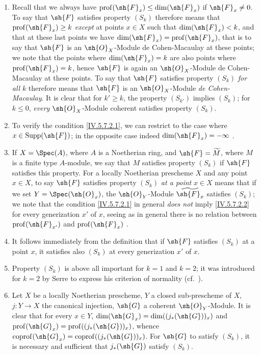 \begin{remarks}[5.7.3]
\label{IV.5.7.3}
\begin{enumerate}[label=(\roman*)]
  \item Recall that we always have $\operatorname{prof}(\sh{F}_x)\leq\dim(\sh{F}_x)$  if $\sh{F}_x\neq 0$.
To say that $\sh{F}$ satisfies property $(S_k)$ therefore means that $\operatorname{prof}(\sh{F}_x)\geq k$ \emph{except} at points $x\in X$ such that $\dim(\sh{F}_x)<k$, and that at these last points we have $\dim(\sh{F}_x)=\operatorname{prof}(\sh{F}_x)$, that is to say  that $\sh{F}$ is an $\sh{O}_X$-Module de Cohen-Macaulay at these points; we note that the points where $\dim(\sh{F}_x)=k$ are also points where $\operatorname{prof}(\sh{F}_x)=k$,
hence $\sh{F}$ is again an $\sh{O}_X$-Module de Cohen-Macaulay at these points.
To say that $\sh{F}$ satisfies property $(S_k)$ \emph{for all} $k$ therefore means that $\sh{F}$ is an $\sh{O}_X$-Module \emph{de Cohen-Macaulay}.
It is clear that for $k'\geq k$, the property $(S_{k'})$ implies $(S_k)$; for $k\leq 0$, \emph{every} $\sh{O}_X$-Module coherent satisfies property $(S_k)$.
  \item To verify the condition \eqref{IV.5.7.2.1}, we can restrict to the case where $x\in\operatorname{Supp}(\sh{F})$; in the opposite case indeed $\dim(\sh{F}_x)=-\infty$ .
  \item If $X=\Spec(A)$, where $A$ is a Noetherian ring, and $\sh{F}=\widetilde{M}$, where $M$ is a finite type $A$-module, we say that $M$ satisfies property $(S_k)$ if $\sh{F}$ satisfies this property.
For a locally Noetherian prescheme $X$ and any point $x\in X$, to say $\sh{F}$ satisfies property $(S_k)$ \emph{at a point} $x\in X$ means that if we set $Y=\Spec(\sh{O}_x)$, the $\sh{O}_Y$-Module $\widetilde{\sh{F}_x}$ satisfies $(S_k)$; we note that the condition \eqref{IV.5.7.2.1} in general \emph{does not} imply \eqref{IV.5.7.2.2} for every generization $x'$ of $x$, seeing as in general there is no relation between $\operatorname{prof}(\sh{F}_{x'})$ and $\operatorname{prof}(\sh{F}_{x})$ .
  \item It follows immediately from the definition that if $\sh{F}$ satisfies $(S_k)$ at a point $x$, it satisfies also $(S_k)$ at every generization $x'$ of $x$.
  \item Property $(S_k)$ is above all important for $k=1$ and $k=2$; it was introduced for $k=2$ by Serre to express his criterion of normality (cf.\ ).
  \item Let $X$ be a locally Noetherian prescheme, $Y$ a closed sub-prescheme of $X$, $j:Y\to X$ the canonical injection, $\sh{G}$ a coherent $\sh{O}_Y$-Module.
It is clear that for every $x\in Y$, $\dim(\sh{G}_x)=\dim((j_*(\sh{G}))_x)$ and $\operatorname{prof}(\sh{G}_x)=\operatorname{prof}((j_*(\sh{G}))_x)$, whence $\operatorname{coprof}(\sh{G}_x)=\operatorname{coprof}((j_*(\sh{G}))_x)$.
For $\sh{G}$ to satisfy $(S_k)$, it is necessary and sufficient that $j_*(\sh{G})$ satisfy $(S_k)$.
\end{enumerate}
\end{remarks}

